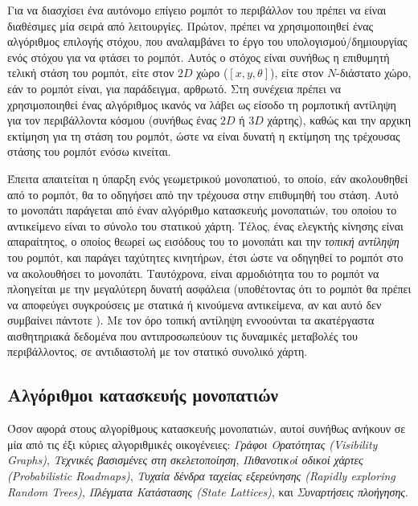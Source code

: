 Για να διασχίσει ένα αυτόνομο επίγειο ρομπότ το περιβάλλον του πρέπει να είναι
διαθέσιμες μία σειρά από λειτουργίες. Πρώτον, πρέπει να χρησιμοποιηθεί ένας
αλγόριθμος επιλογής στόχου, που αναλαμβάνει το έργο του υπολογισμού/δημιουργίας
ενός στόχου για να φτάσει το ρομπότ. Αυτός ο στόχος είναι συνήθως η επιθυμητή
τελική στάση του ρομπότ, είτε στον $2D$ χώρο ($[x, y, \theta]$), είτε στον
$N$-διάστατο χώρο, εάν το ρομπότ είναι, για παράδειγμα, αρθρωτό. Στη συνέχεια
πρέπει να χρησιμοποιηθεί ένας αλγόριθμος ικανός να λάβει ως είσοδο τη ρομποτική
αντίληψη για τον περιβάλλοντα κόσμου (συνήθως ένας $2D$ ή $3D$ χάρτης), καθώς
και την αρχικη εκτίμηση για τη στάση του ρομπότ, ώστε να είναι δυνατή η
εκτίμηση της τρέχουσας στάσης του ρομπότ ενόσω κινείται.

Έπειτα απαιτείται η ύπαρξη ενός γεωμετρικού μονοπατιού, το οποίο, εάν
ακολουθηθεί από το ρομπότ, θα το οδηγήσει από την τρέχουσα στην επιθυμηθή του
στάση. Αυτό το μονοπάτι παράγεται από έναν αλγόριθμο κατασκευής μονοπατιών, του
οποίου το αντικείμενο είναι το σύνολο του στατικού χάρτη. Τέλος, ένας ελεγκτής
κίνησης είναι απαραίτητος, ο οποίος θεωρεί ως εισόδους του το μονοπάτι και την
\textit{τοπική αντίληψη} του ρομπότ, και παράγει ταχύτητες κινητήρων, έτσι ώστε
να οδηγηθεί το ρομπότ στο να ακολουθήσει το μονοπάτι.  Ταυτόχρονα, είναι
αρμοδιότητα του το ρομπότ να πλοηγείται με την μεγαλύτερη δυνατή ασφάλεια
(υποθέτοντας ότι το ρομπότ θα πρέπει να αποφεύγει συγκρούσεις με στατικά ή
κινούμενα αντικείμενα, αν και αυτό δεν συμβαίνει πάντοτε \cite{Gandhi2017}). Με
τον όρο τοπική αντίληψη εννοούνται τα ακατέργαστα αισθητηριακά δεδομένα που
αντιπροσωπεύουν τις δυναμικές μεταβολές του περιβάλλοντος, σε αντιδιαστολή με
τον στατικό συνολικό χάρτη.

\subsection{Αλγόριθμοι κατασκευής μονοπατιών}

Όσον αφορά στους αλγορίθμους κατασκευής μονοπατιών, αυτοί συνήθως ανήκουν σε
μία από τις έξι κύριες αλγοριθμικές οικογένειες: \textit{Γράφοι Ορατότητας
(Visibility Graphs)}, \textit{Τεχνικές βασισμένες στη σκελετοποίηση},
\textit{Πιθανοτικoί οδικοί χάρτες (Probabilistic Roadmaps)}, \textit{Τυχαία
δένδρα ταχείας εξερεύνησης (Rapidly exploring Random Trees)}, \textit{Πλέγματα
Κατάστασης (State Lattices)}, και \textit{Συναρτήσεις πλοήγησης}.

